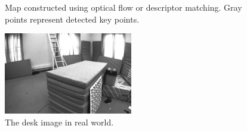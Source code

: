 \documentclass{easychair}
\begin{document}
\begin{figure}[h!]
\centering
{}
\caption{Map constructed using optical flow or descriptor matching. Gray points represent detected key points.}
\end{figure}

\begin{figure}
	\centering
	\includegraphics[width=0.5\textwidth]{img/desk.png}
	\caption{The desk image in real world.}
	\label{fig:desk}
\end{figure}
\end{document}

